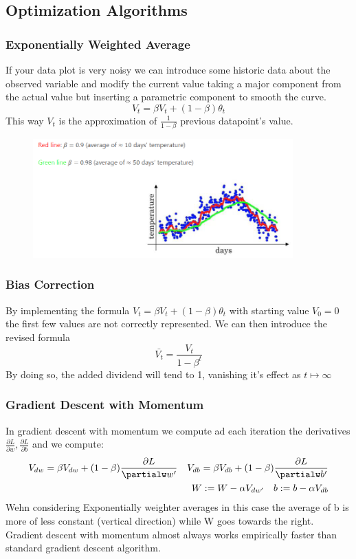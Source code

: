 \documentclass{article}
\begin{document}
\subsection{Optimization Algorithms}
\subsubsection{Exponentially Weighted Average}
If your data plot is very noisy we can introduce some historic data about the observed variable and modify the current value taking a major component from the actual value but inserting a parametric component to smooth the curve.
\[ 
    V_t = \beta V_t+(1-\beta)\theta_t 
\]This way $V_t$ is the approximation of $\frac{1}{1-\beta}$ previous datapoint's value.
\begin{figure}[htbp]
    \centering
    \includegraphics[width=10cm]{weighted_average.png}
\end{figure}
\subsubsection*{Bias Correction}
By implementing the formula $V_t = \beta V_t+(1-\beta)\theta_t $ with starting value $V_0 = 0$ the first few values are not correctly represented. We can then introduce the revised formula
\[ 
    \bar{V_t} = \frac{V_t}{1-\beta^t} 
\]By doing so, the added dividend will tend to 1, vanishing it's effect as $t \mapsto \infty$
\subsubsection*{Gradient Descent with Momentum}
In gradient descent with momentum we compute ad each iteration the derivatives $\frac{\partial L }{\partial w}, \frac{\partial L }{\partial b}$ and we compute:
\begin{align*}
    V_{dw}=\beta V_{dw}+(1-\beta)\frac{\partial L}{\partialw w'} \quad V_{db}=\beta V_{db}+(1-\beta)\frac{\partial L}{\partialw b'} \\
    W:= W - \alpha V_{dw'}\quad b:= b-\alpha V_{db}
\end{align*}
Wehn considering Exponentially weighter averages in this case the average of b is more of less constant (vertical direction) while W goes towards the right. 
Gradient descent with momentum almost always works empirically  faster than standard gradient descent algorithm. 


\end{document}
